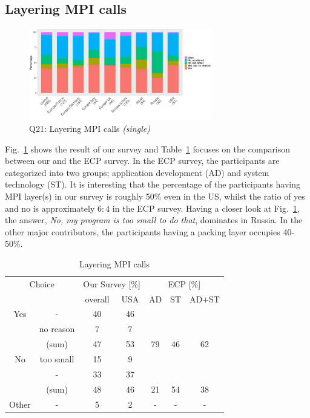 \documentclass[preprint,5p,times]{elsarticle}
\def\myquote#1{{\it #1}}
\def\mcountries{major contributors\xspace{}}%
\begin{document}
\subsection{Layering MPI calls}\label{sec:mpi-calls}

\begin{figure}[htb]
  \begin{center}
    \includegraphics[width=8.0cm]{R-scripts/Q21.pdf}
    \vspace{-2mm}
    \caption{Q21: Layering MPI calls {\it(single)}}
    \label{fig:layering-mpi-calls}
  \end{center}
\end{figure}

Fig.~\ref{fig:layering-mpi-calls} shows the result of our survey and
Table~\ref{tab:layering-mpi-calls} focuses on the comparison between our
and the ECP survey. In the ECP survey, the participants are categorized
into two groups; application development (AD) and system technology
(ST). It is interesting that the percentage of the participants having
MPI layer(s) in our survey is roughly 50\% even in the US, whilst the
ratio of yes and no is approximately $6:4$ in the ECP survey.
Having a closer look at Fig.~\ref{fig:layering-mpi-calls}, the answer,
\myquote{No, my program is too small to do that}, dominates in Russia. In
the other \mcountries, the participants having a packing layer occupies
40-50\%.

\begin{table}[htb]%
  \small%
  \begin{center}%
    \caption{Layering MPI calls}\label{tab:layering-mpi-calls}%
    \begin{tabular}{c|c||c|c||c|c|c}%
      \hline%
      \multicolumn{2}{c||}{Choice} & \multicolumn{2}{c||}{Our Survey [\%]} &
      \multicolumn{3}{c}{ECP [\%]} \\
      \cline{3-7}%
      \multicolumn{2}{c||}{} & overall & USA & AD & ST & AD+ST \\
      \hline%
      \hline%
      Yes & - & 40 & 46 & & & \\
      & no reason & 7 & 7 & & & \\
      \cline{2-4}%
      & (sum) & 47 & 53 &  79 & 46 & 62 \\
      \hline%
      \hline%
      No & too small & 15 & 9 & & & \\
      & - & 33 & 37 & & & \\
      \cline{2-4}%
      & (sum) & 48 & 46 & 21 & 54 & 38 \\
      \hline%
      \hline%
      Other & - & 5 & 2 & - & - & - \\
      \hline%
    \end{tabular}%
  \end{center}%
\end{table}%
\end{document}
